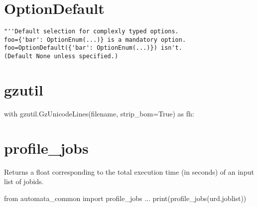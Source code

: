 \section{OptionDefault}
\begin{verbatim}
"''Default selection for complexly typed options.
foo={'bar': OptionEnum(...)} is a mandatory option.
foo=OptionDefault({'bar': OptionEnum(...)}) isn't.
(Default None unless specified.)
\end{verbatim}



\section{gzutil}
\begin{python}
with gzutil.GzUnicodeLines(filename, strip_bom=True) as fh:
\end{python}



\section{profile\_jobs}
Returns a float corresponding to the total execution time (in seconds)
of an input list of jobids.
\begin{python}
from automata_common import profile_jobs
...
print(profile_jobs(urd.joblist))
\end{python}
